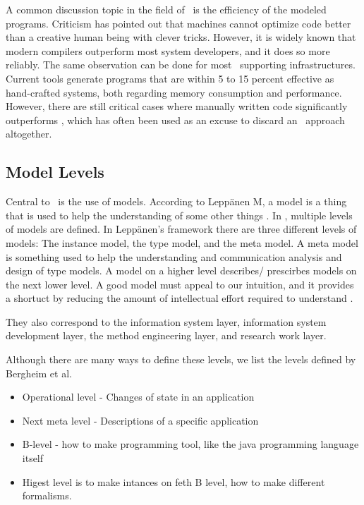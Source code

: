 A common discussion topic in the field of \mde~is the efficiency of the modeled programs. Criticism has pointed out that machines cannot optimize code better than a creative human being with clever tricks. However, it is widely known that modern compilers outperform most system developers, and it does so more reliably. The same observation can be done for most \mdd~supporting infrastructures. Current tools generate programs that are within 5 to 15 percent effective as hand-crafted systems, both regarding memory consumption and performance. However, there are still critical cases where manually written code significantly outperforms \mde, which has often been used as an excuse to discard an \mdd~approach altogether.

\subsection{Model Levels}
\label{sub:Model Levels}
Central to \mde~is the use of models. According to Leppänen M, a model is a thing that is used to help the understanding of some other things \cite{Leppanen2006-ay}. In \mdd, multiple levels of models are defined. In Leppänen's framework there are three different levels of models: The instance model, the type model, and the meta model. A meta model is something used to help the understanding and communication analysis and design of type models. A model on a higher level describes/ prescirbes models on the next lower level. A good model must appeal to our intuition, and it provides a shortuct by reducing the amount of intellectual effort required to understand \cite{Selic2013-qa}.

They also correspond to the information system layer, information system development layer, the method engineering layer, and research work layer.

Although there are many ways to define these levels, we list the levels defined by Bergheim et al.
\begin{itemize}
    \item Operational level - Changes of state in an application
    \item Next meta level - Descriptions of a specific application
    \item B-level - how to make programming tool, like the java programming language itself
    \item Higest level is to make intances on feth B level, how to make different formalisms.
\end{itemize}

